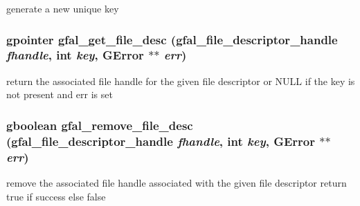 generate a new unique key 
\subsubsection{\setlength{\rightskip}{0pt plus 5cm}gpointer gfal\_\-get\_\-file\_\-desc (gfal\_\-file\_\-descriptor\_\-handle {\em fhandle}, int {\em key}, GError $\ast$$\ast$ {\em err})}\label{gfal__common__filedescriptor_8c_b1812a17fc7c430f91d738fa51a7f48d}


return the associated file handle for the given file descriptor or NULL if the key is not present and err is set 
\subsubsection{\setlength{\rightskip}{0pt plus 5cm}gboolean gfal\_\-remove\_\-file\_\-desc (gfal\_\-file\_\-descriptor\_\-handle {\em fhandle}, int {\em key}, GError $\ast$$\ast$ {\em err})}\label{gfal__common__filedescriptor_8c_943c20a3d9a14dd8f86ba1abe7bee316}


remove the associated file handle associated with the given file descriptor return true if success else false 